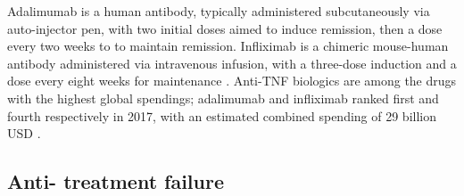 Adalimumab is a human antibody, typically administered subcutaneously via auto-injector pen, with two initial doses aimed to induce remission, then a dose every two weeks to to maintain remission. 
Infliximab is a chimeric mouse-human antibody administered via intravenous infusion, with a three-dose induction and a dose every eight weeks for maintenance \autocite{adegbola2018AntiTNFTherapyCrohn}.
Anti-\gls{TNF} biologics are among the drugs with the highest global spendings; adalimumab and infliximab ranked first and fourth respectively in 2017,
with an estimated combined spending of 29 billion USD \autocite{aitken2019GlobalUseMedicine}.


\subsection{Anti- treatment failure}

